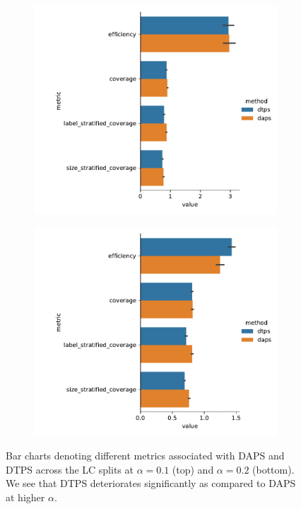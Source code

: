 \begin{figure}
    \centering
    \begin{subfigure}{0.7\linewidth}
        \includegraphics[width=\linewidth]{graphConformal/figures/nspc/daps_dtps_0.1}
    \end{subfigure}
    \begin{subfigure}{0.7\linewidth}
        \includegraphics[width=\linewidth]{graphConformal/figures/nspc/daps_dtps_0.2}
    \end{subfigure}
    \caption{Bar charts denoting different metrics associated with DAPS and DTPS across the LC splits at $\alpha=0.1$ (top) and $\alpha=0.2$ (bottom). We see that DTPS deteriorates significantly as compared to DAPS at higher $\alpha$.}
    \label{fig:nspc:conformal:daps_vs_dtps}
\end{figure}

